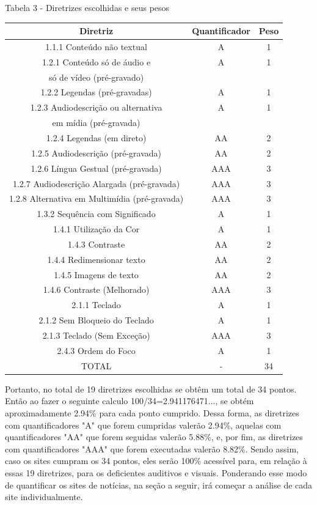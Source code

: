 \documentclass[a4paper]{article}
\begin{document}
\begin{titlepage}
Tabela 3 - Diretrizes escolhidas e seus pesos\\[-1cm]
\begin{center}
	\fontsize{8pt}{8pt}\selectfont
	\begin{longtable}{|c|c|c|}
		\hline
		Diretriz & Quantificador & Peso\\
		\hline
		1.1.1 Conteúdo não textual & A & 1\\
		\hline
		1.2.1 Conteúdo só de áudio e & A & 1\\
		só de vídeo (pré-gravado) & & \\
		\hline
		1.2.2 Legendas (pré-gravadas) & A & 1\\
		\hline
		1.2.3 Audiodescrição ou alternativa & A & 1\\
		em mídia (pré-gravada) & & \\
		\hline
		1.2.4 Legendas (em direto) & AA & 2\\
		\hline
		1.2.5 Audiodescrição (pré-gravada) & AA & 2\\
		\hline
		1.2.6 Língua Gestual (pré-gravada) & AAA & 3\\
		\hline
		1.2.7 Audiodescrição Alargada (pré-gravada) & AAA & 3\\
		\hline
		1.2.8 Alternativa em Multimídia (pré-gravada) & AAA & 3\\
		\hline
		1.3.2 Sequência com Significado & A & 1\\
		\hline
		1.4.1 Utilização da Cor & A & 1\\
		\hline
		1.4.3 Contraste & AA & 2\\
		\hline
		1.4.4 Redimensionar texto & AA & 2\\
		\hline
		1.4.5 Imagens de texto & AA & 2\\
		\hline
		1.4.6 Contraste (Melhorado) & AAA & 3\\
		\hline
		2.1.1 Teclado & A & 1\\
		\hline
		2.1.2 Sem Bloqueio do Teclado & A & 1\\
		\hline
		2.1.3 Teclado (Sem Exceção) & AAA & 3\\
		\hline
		2.4.3 Ordem do Foco & A & 1\\
		\hline
		TOTAL & - & 34\\
		\hline
	\end{longtable}
\end{center}

Portanto, no total de 19 diretrizes escolhidas se obtêm um total de 34 pontos. Então ao fazer o seguinte calculo 100/34=2.941176471..., se obtém aproximadamente 2.94\% para cada ponto cumprido. Dessa forma, as diretrizes com quantificadores "A" que forem cumpridas valerão 2.94\%, aquelas com quantificadores "AA" que forem seguidas valerão 5.88\%, e, por fim, as diretrizes com quantificadores "AAA" que forem executadas valerão 8.82\%. Sendo assim, caso os sites cumpram os 34 pontos, eles serão 100\% acessível para, em relação à essas 19 diretrizes, para os deficientes auditivos e visuais. Ponderando esse modo de quantificar os sites de notícias, na seção a seguir, irá começar a análise de cada site individualmente.


\end{titlepage}
\end{document}
